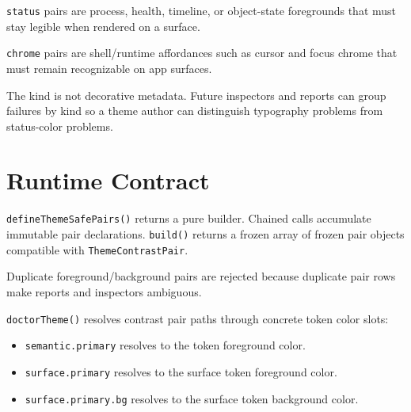 \texttt{s\allowbreak{}t\allowbreak{}a\allowbreak{}t\allowbreak{}u\allowbreak{}s} pairs are process, health, timeline, or object-state foregrounds that must stay legible when rendered on a surface.

\texttt{c\allowbreak{}h\allowbreak{}r\allowbreak{}o\allowbreak{}m\allowbreak{}e} pairs are shell/runtime affordances such as cursor and focus chrome that must remain recognizable on app surfaces.

The kind is not decorative metadata. Future inspectors and reports can group failures by kind so a theme author can distinguish typography problems from status-color problems.

\section{Runtime Contract}\label{record-180-runtime-contract}

\texttt{d\allowbreak{}e\allowbreak{}f\allowbreak{}i\allowbreak{}n\allowbreak{}e\allowbreak{}T\allowbreak{}h\allowbreak{}e\allowbreak{}m\allowbreak{}e\allowbreak{}S\allowbreak{}a\allowbreak{}f\allowbreak{}e\allowbreak{}P\allowbreak{}a\allowbreak{}i\allowbreak{}r\allowbreak{}s\allowbreak{}(\allowbreak{})} returns a pure builder. Chained calls accumulate immutable pair declarations. \texttt{b\allowbreak{}u\allowbreak{}i\allowbreak{}l\allowbreak{}d\allowbreak{}(\allowbreak{})} returns a frozen array of frozen pair objects compatible with \texttt{T\allowbreak{}h\allowbreak{}e\allowbreak{}m\allowbreak{}e\allowbreak{}C\allowbreak{}o\allowbreak{}n\allowbreak{}t\allowbreak{}r\allowbreak{}a\allowbreak{}s\allowbreak{}t\allowbreak{}P\allowbreak{}a\allowbreak{}i\allowbreak{}r}.

Duplicate foreground/background pairs are rejected because duplicate pair rows make reports and inspectors ambiguous.

\texttt{d\allowbreak{}o\allowbreak{}c\allowbreak{}t\allowbreak{}o\allowbreak{}r\allowbreak{}T\allowbreak{}h\allowbreak{}e\allowbreak{}m\allowbreak{}e\allowbreak{}(\allowbreak{})} resolves contrast pair paths through concrete token color slots:

\begin{itemize}
\tightlist
\item
  \texttt{s\allowbreak{}e\allowbreak{}m\allowbreak{}a\allowbreak{}n\allowbreak{}t\allowbreak{}i\allowbreak{}c\allowbreak{}.\allowbreak{}p\allowbreak{}r\allowbreak{}i\allowbreak{}m\allowbreak{}a\allowbreak{}r\allowbreak{}y} resolves to the token foreground color.
\item
  \texttt{s\allowbreak{}u\allowbreak{}r\allowbreak{}f\allowbreak{}a\allowbreak{}c\allowbreak{}e\allowbreak{}.\allowbreak{}p\allowbreak{}r\allowbreak{}i\allowbreak{}m\allowbreak{}a\allowbreak{}r\allowbreak{}y} resolves to the surface token foreground color.
\item
  \texttt{s\allowbreak{}u\allowbreak{}r\allowbreak{}f\allowbreak{}a\allowbreak{}c\allowbreak{}e\allowbreak{}.\allowbreak{}p\allowbreak{}r\allowbreak{}i\allowbreak{}m\allowbreak{}a\allowbreak{}r\allowbreak{}y\allowbreak{}.\allowbreak{}b\allowbreak{}g} resolves to the surface token background color.
\end{itemize}

